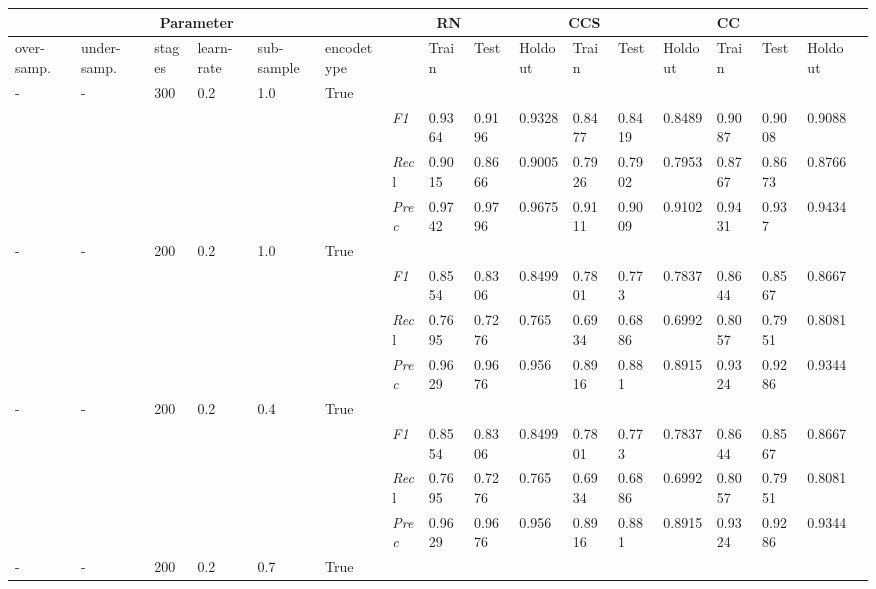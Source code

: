 \begin{table}[]
\tiny
\tabcolsep=0.11cm
\begin{tabularx}{\textwidth}{XXXXXX|X|XXX|XXX|XXXX}
\toprule
\multicolumn{6}{c}{Parameter} & \multicolumn{3}{c}{RN} & \multicolumn{3}{c}{CCS} & \multicolumn{3}{c}{CC} \\ \midrule
over-\newline samp. & under-\newline samp. & stages &learn-\newline rate & sub-\newline sample & encode\newline type & & Train &  Test & Holdout & Train &  Test & Holdout & Train &  Test & Holdout \\ \midrule
- & - & 300 & 0.2 & 1.0 &True & & & & & & & & & \\
& & & & & & \textit{F1} & 0.9364 & 0.9196 & 0.9328 & 0.8477 & 0.8419        & 0.8489        & 0.9087        & 0.9008        & 0.9088        \\
& & & & & & \textit{Rec}l & 0.9015 & 0.8666 & 0.9005    & 0.7926 & 0.7902    & 0.7953    & 0.8767    & 0.8673    & 0.8766    \\
& & & & & & \textit{Prec} & 0.9742 & 0.9796 & 0.9675 & 0.9111 & 0.9009 & 0.9102 & 0.9431 & 0.937 & 0.9434 \\ \midrule
- & - & 200 & 0.2 & 1.0 &True & & & & & & & & & \\
& & & & & & \textit{F1} & 0.8554 & 0.8306 & 0.8499 & 0.7801 & 0.773        & 0.7837        & 0.8644        & 0.8567        & 0.8667        \\
& & & & & & \textit{Rec}l & 0.7695 & 0.7276 & 0.765    & 0.6934 & 0.6886    & 0.6992    & 0.8057    & 0.7951    & 0.8081    \\
& & & & & & \textit{Prec} & 0.9629 & 0.9676 & 0.956 & 0.8916 & 0.881 & 0.8915 & 0.9324 & 0.9286 & 0.9344 \\ \midrule
- & - & 200 & 0.2 & 0.4 &True & & & & & & & & & \\
& & & & & & \textit{F1} & 0.8554 & 0.8306 & 0.8499 & 0.7801 & 0.773        & 0.7837        & 0.8644        & 0.8567        & 0.8667        \\
& & & & & & \textit{Rec}l & 0.7695 & 0.7276 & 0.765    & 0.6934 & 0.6886    & 0.6992    & 0.8057    & 0.7951    & 0.8081    \\
& & & & & & \textit{Prec} & 0.9629 & 0.9676 & 0.956 & 0.8916 & 0.881 & 0.8915 & 0.9324 & 0.9286 & 0.9344 \\ \midrule
- & - & 200 & 0.2 & 0.7 &True & & & & & & & & & \\

\end{tabularx}
\end{table}
